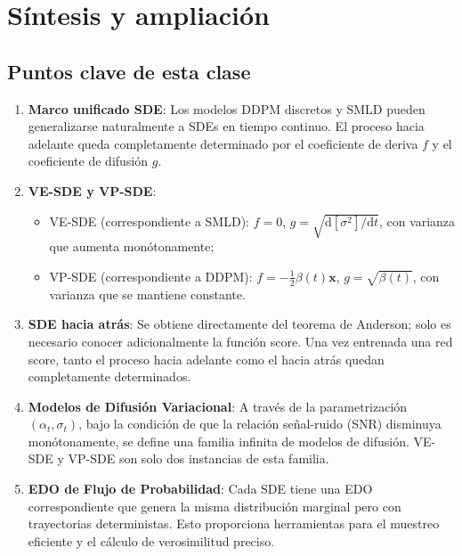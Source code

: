 \section{Síntesis y ampliación}

\subsection{Puntos clave de esta clase}

\begin{enumerate}
    \item \textbf{Marco unificado SDE}: Los modelos DDPM discretos y SMLD pueden generalizarse naturalmente a SDEs en tiempo continuo. El proceso hacia adelante queda completamente determinado por el coeficiente de deriva $f$ y el coeficiente de difusión $g$.

    \item \textbf{VE-SDE y VP-SDE}:
    \begin{itemize}
        \item VE-SDE (correspondiente a SMLD): $f = 0$, $g = \sqrt{\mathrm{d}[\sigma^2]/\mathrm{d}t}$, con varianza que aumenta monótonamente;
        \item VP-SDE (correspondiente a DDPM): $f = -\frac{1}{2}\beta(t)\mathbf{x}$, $g = \sqrt{\beta(t)}$, con varianza que se mantiene constante.
    \end{itemize}

    \item \textbf{SDE hacia atrás}: Se obtiene directamente del teorema de Anderson; solo es necesario conocer adicionalmente la función score. Una vez entrenada una red score, tanto el proceso hacia adelante como el hacia atrás quedan completamente determinados.

    \item \textbf{Modelos de Difusión Variacional}: A través de la parametrización $(\alpha_t, \sigma_t)$, bajo la condición de que la relación señal-ruido (SNR) disminuya monótonamente, se define una familia infinita de modelos de difusión. VE-SDE y VP-SDE son solo dos instancias de esta familia.

    \item \textbf{EDO de Flujo de Probabilidad}: Cada SDE tiene una EDO correspondiente que genera la misma distribución marginal pero con trayectorias deterministas. Esto proporciona herramientas para el muestreo eficiente y el cálculo de verosimilitud preciso.
\end{enumerate}

